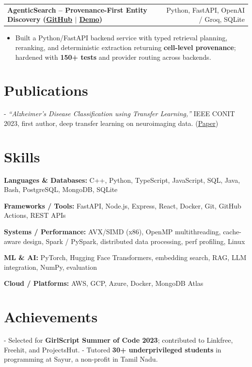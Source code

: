 \documentclass[letterpaper,11pt]{article}
\makeatletter
\newcommand{\projItem}[2]{%
  \vspace{6pt}
  \begin{tabular*}{\textwidth}{@{}l@{\extracolsep{\fill}}r@{}}
    \textbf{#1} & #2 \\
  \end{tabular*}\par\vspace{-2pt}
}
\newcommand{\skillLine}[2]{\textbf{#1:} #2\par\vspace{2pt}}
\newcommand{\inlineBlock}[1]{{\setlength{\leftskip}{0.18in}\small #1\par}}
\makeatother
\begin{document}
\projItem{AgenticSearch -- Provenance-First Entity Discovery {\normalfont\small(\href{https://github.com/Deva-1903/ciir_agentic_search}{GitHub} $\vert$ \href{https://agentic-search-negglszkwa-uc.a.run.app}{Demo})}}{Python, FastAPI, OpenAI / Groq, SQLite}
\begin{itemize}
  \item Built a Python/FastAPI backend service with typed retrieval planning, reranking, and deterministic extraction returning \textbf{cell-level provenance}; hardened with \textbf{150+ tests} and provider routing across backends.
\end{itemize}

\section{Publications}
\inlineBlock{- \textit{``Alzheimer's Disease Classification using Transfer Learning,''} IEEE CONIT 2023, first author, deep transfer learning on neuroimaging data. {\normalfont\small(\href{https://ieeexplore.ieee.org/document/10205760}{Paper})}}

\section{Skills}
\skillLine{Languages \& Databases}{C++, Python, TypeScript, JavaScript, SQL, Java, Bash, PostgreSQL, MongoDB, SQLite}
\skillLine{Frameworks / Tools}{FastAPI, Node.js, Express, React, Docker, Git, GitHub Actions, REST APIs}
\skillLine{Systems / Performance}{AVX/SIMD (x86), OpenMP multithreading, cache-aware design, Spark / PySpark, distributed data processing, perf profiling, Linux}
\skillLine{ML \& AI}{PyTorch, Hugging Face Transformers, embedding search, RAG, LLM integration, NumPy, evaluation}
\skillLine{Cloud / Platforms}{AWS, GCP, Azure, Docker, MongoDB Atlas}

\section{Achievements}
\inlineBlock{- Selected for \textbf{GirlScript Summer of Code 2023}; contributed to Linkfree, Freehit, and ProjectsHut. - Tutored \textbf{30+ underprivileged students} in programming at Sayur, a non-profit in Tamil Nadu.}
\end{document}
